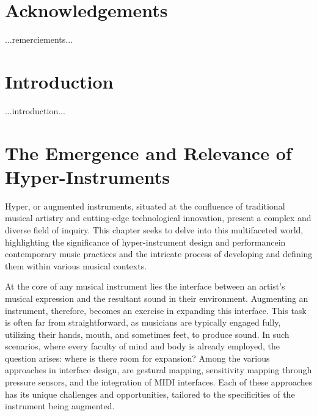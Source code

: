 \documentclass[12pt,twoside,maitrise]{dms}
\theoremstyle{definition}
\begin{document}

\chapter*{Acknowledgements}

...remerciements...


\NoChapterPageNumber
\cleardoublepage


\chapter*{Introduction}

...introduction...


\chapter{The Emergence and Relevance of Hyper-Instruments}

Hyper, or augmented instruments, situated at the confluence of traditional musical artistry and cutting-edge technological innovation, present a complex and diverse field of inquiry.
This chapter seeks to delve into this multifaceted world, highlighting the significance of hyper-instrument design and performancein contemporary music practices and the intricate process of developing and defining them within various musical contexts.

At the core of any musical instrument lies the interface between an artist's musical expression and the resultant sound in their environment.
Augmenting an instrument, therefore, becomes an exercise in expanding this interface.
This task is often far from straightforward, as musicians are typically engaged fully, utilizing their hands, mouth, and sometimes feet, to produce sound.
In such scenarios, where every faculty of mind and body is already employed, the question arises: where is there room for expansion?
Among the various approaches in interface design, are gestural mapping, sensitivity mapping through pressure sensors, and the integration of MIDI interfaces.
Each of these approaches has its unique challenges and opportunities, tailored to the specificities of the instrument being augmented.
\end{document}
